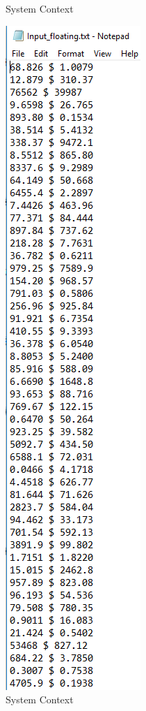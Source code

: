 \documentclass[12pt, titlepage]{article}
\begin{document}
\begin{enumerate}
\begin{figure}[h!]
\begin{minipage}[b]{0.4\textwidth}
\caption{System Context}
\label{Fig_Inputcomplex} 
\end{minipage}
\hfill
\begin{minipage}[b]{0.31\textwidth}
 \includegraphics[width=\textwidth]{Input_floating}
\caption{System Context}
\label{Fig_Inputfloating} 
\end{minipage}
\end{figure}
		

\end{enumerate}
\end{document}
